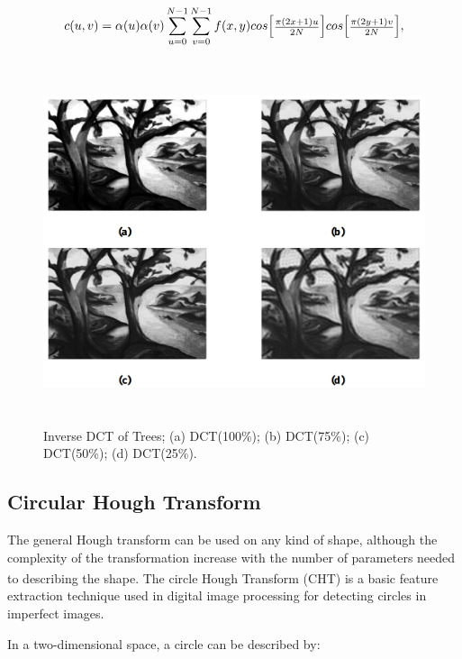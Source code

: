 \begin{equation}
    c(u,v)=\alpha (u)\alpha (v)\sum_{u=0}^{N-1}\sum_{v=0}^{N-1} f(x,y) cos {\begin{bmatrix} {{\pi (2x + 1)u}\over{2N}} \end{bmatrix}} cos {\begin{bmatrix} {{\pi (2y + 1)v}\over{2N}} \end{bmatrix}} ,
    \label{eq:Discrete cosine transform equation}
\end{equation}

\begin{figure}[H]
\centering
    \centerline{\includegraphics[width = 4.6in, height = 4.2in]{../images/inverse-DCT-of-trees.png}}
    \caption{Inverse DCT of Trees; (a) DCT(100\%); (b) DCT(75\%); (c) DCT(50\%); (d) DCT(25\%).}
\end{figure}

\subsection{Circular Hough Transform}

The general Hough transform can be used on any kind of shape, although the complexity of the transformation increase with the number of parameters needed to describing the shape. \textsuperscript{\cite{pedersen2007circular}}
The circle Hough Transform (CHT) is a basic feature extraction technique used in digital image processing for detecting circles in imperfect images.

In a two-dimensional space, a circle can be described by:

